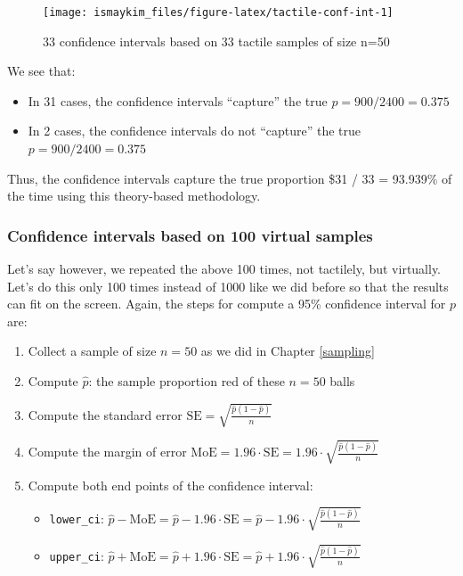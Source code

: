 \documentclass[12pt,]{krantz}
\providecommand{\tightlist}{%
  \setlength{\itemsep}{0pt}\setlength{\parskip}{0pt}}
\begin{document}
\begin{figure}

{\centering \texttt{[image: ismaykim\_files/figure-latex/tactile-conf-int-1]} 

}

\caption{33 confidence intervals based on 33 tactile samples of size n=50}\label{fig:tactile-conf-int}
\end{figure}

We see that:

\begin{itemize}
\tightlist
\item
  In 31 cases, the confidence intervals ``capture'' the true
  \(p = 900 / 2400 = 0.375\)
\item
  In 2 cases, the confidence intervals do not ``capture'' the true
  \(p = 900 / 2400 = 0.375\)
\end{itemize}

Thus, the confidence intervals capture the true proportion \$31 / 33 =
93.939\% of the time using this theory-based methodology.

\subsubsection*{Confidence intervals based on 100 virtual
samples}\label{confidence-intervals-based-on-100-virtual-samples}

Let's say however, we repeated the above 100 times, not tactilely, but
virtually. Let's do this only 100 times instead of 1000 like we did
before so that the results can fit on the screen. Again, the steps for
compute a 95\% confidence interval for \(p\) are:

\begin{enumerate}
\def\labelenumi{\arabic{enumi}.}
\tightlist
\item
  Collect a sample of size \(n = 50\) as we did in Chapter
  \ref{sampling}
\item
  Compute \(\widehat{p}\): the sample proportion red of these \(n=50\)
  balls
\item
  Compute the standard error
  \(\text{SE} = \sqrt{\frac{\widehat{p}(1-\widehat{p})}{n}}\)
\item
  Compute the margin of error
  \(\text{MoE} = 1.96 \cdot \text{SE} = 1.96 \cdot \sqrt{\frac{\widehat{p}(1-\widehat{p})}{n}}\)
\item
  Compute both end points of the confidence interval:

  \begin{itemize}
  \tightlist
  \item
    \texttt{lower\_ci}:
    \(\widehat{p} - \text{MoE} = \widehat{p} - 1.96 \cdot \text{SE} = \widehat{p} - 1.96 \cdot \sqrt{\frac{\widehat{p}(1-\widehat{p})}{n}}\)
  \item
    \texttt{upper\_ci}:
    \(\widehat{p} + \text{MoE} = \widehat{p} + 1.96 \cdot \text{SE} = \widehat{p} +1.96 \cdot \sqrt{\frac{\widehat{p}(1-\widehat{p})}{n}}\)
  \end{itemize}
\end{enumerate}
\end{document}
